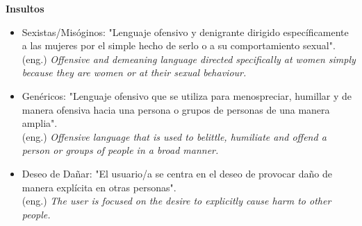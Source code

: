 \textbf{Insultos}
\begin{itemize}
    \item Sexistas/Misóginos: "Lenguaje ofensivo y denigrante dirigido específicamente a las mujeres por el simple hecho de serlo o a su comportamiento sexual".\\
    (eng.) \textit{Offensive and demeaning language directed specifically at women simply because they are women or at their sexual behaviour.}
    
    \item Genéricos: "Lenguaje ofensivo que se utiliza para menospreciar, humillar y de manera ofensiva hacia una persona o grupos de personas de una manera amplia".\\
    (eng.) \textit{Offensive language that is used to belittle, humiliate and offend a person or groups of people in a broad manner.}
    
    \item Deseo de Dañar: "El usuario/a se centra en el deseo de provocar daño de manera explícita en otras personas".\\
    (eng.) \textit{The user is focused on the desire to explicitly cause harm to other people.}
\end{itemize}




